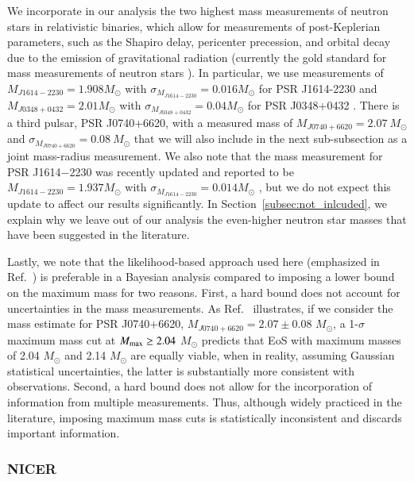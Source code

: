 \documentclass[aps,prd,nofootinbib,tightenlines,notitlepage,floatfix,superscriptaddress,showkeys,twocolumn]{revtex4-1}
\begin{document}
We incorporate in our analysis the two highest mass measurements of neutron stars in relativistic binaries, which allow for measurements of post-Keplerian parameters, such as the Shapiro delay, pericenter precession, and orbital decay due to the emission of gravitational radiation (currently the gold standard for mass measurements of neutron stars \cite{Miller:2019nzo}). In particular, we use measurements of $M_{J1614-2230} = 1.908 M_\odot$ with $\sigma_{M_{J1614-2230}} =  0.016 M_\odot$ for PSR J1614-2230 \cite{demorest2010two,arzoumanian2018nanograv} and $M_{J0348+0432} = 2.01 M_\odot$ with $\sigma_{M_{J0348+0432}} = 0.04 M_\odot$ for PSR J0348+0432 \cite{antoniadis2013massive}. There is a third pulsar, PSR J0740+6620, with a measured mass of $M_{J0740+6620} = 2.07~M_\odot$ and $\sigma_{M_{J0740+6620}} = 0.08~M_\odot$ \cite{cromartie2020relativistic,Fonseca:2021wxt} that we will also include in the next sub-subsection as a joint mass-radius measurement. We also note that the mass measurement for PSR J1614$-$2230 was recently updated and reported to be $M_{J1614-2230} = 1.937 M_\odot$ with $\sigma_{M_{J1614-2230}} =  0.014 M_\odot$ \cite{NANOGrav:2023hde}, but we do not expect this update to affect our results significantly. In Section~\ref{subsec:not_inlcuded}, we explain why we leave out of our analysis the even-higher neutron star masses that have been suggested in the literature. 

Lastly, we note that the likelihood-based approach used here (emphasized in Ref.~\cite{Miller:2019nzo}) is preferable in a Bayesian analysis compared to imposing a lower bound on the maximum mass for two reasons. First, a hard bound does not account for uncertainties in the mass measurements. As Ref.~\cite{Miller:2019nzo} illustrates, if we consider the mass estimate for PSR J0740+6620, $M_{J0740+6620} = 2.07\pm 0.08$ $M_\odot$, a 1-$\sigma$ maximum mass cut at $M_{\rm max} \geq 2.04$ $M_\odot$ predicts that EoS with maximum masses of 2.04 $M_\odot$ and 2.14 $M_\odot$ are equally viable, when in reality, assuming Gaussian statistical uncertainties, the latter is substantially more consistent with observations. Second, a hard bound does not allow for the incorporation of information from multiple measurements. Thus, although widely practiced in the literature, imposing maximum mass cuts is statistically inconsistent and discards important information. 

\subsubsection{NICER}
\end{document}
